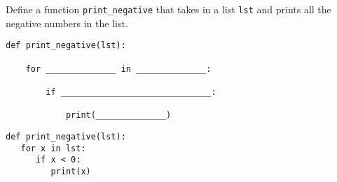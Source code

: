 \question Define a function \texttt{print\_negative} that takes in a list
\texttt{lst} and prints all the negative numbers in the list.

\begin{lstlisting}
def print_negative(lst):

    for ______________ in ______________:

        if ______________________________:

            print(______________)
\end{lstlisting}
\begin{solution}[0cm]
\begin{lstlisting}
def print_negative(lst):
   for x in lst:
      if x < 0:
         print(x)
\end{lstlisting}
\end{solution}
